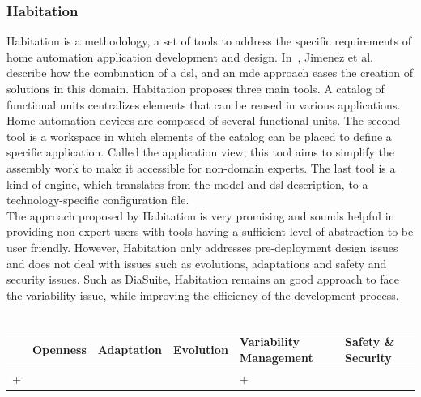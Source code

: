 \subsubsection{Habitation}
Habitation is a methodology, a set of tools to address the specific requirements of home automation application development and design. In~\cite{Jimenez:2009}, Jimenez et al. describe how the combination of a \gls{dsl}, and an \gls{mde} approach eases the creation of solutions in this domain. Habitation proposes three main tools. A catalog of functional units centralizes elements that can be reused in various applications. Home automation devices are composed of several functional units. The second tool is a workspace in which elements of the catalog can be placed to define a specific application. Called the application view, this tool aims to simplify the assembly work to make it accessible for non-domain experts. The last tool is a kind of engine, which translates from the model and \gls{dsl} description, to a technology-specific configuration file.\\

The approach proposed by Habitation is very promising and sounds helpful in providing non-expert users with tools having a sufficient level of abstraction to be user friendly. However, Habitation only addresses pre-deployment design issues and does not deal with issues such as evolutions, adaptations and safety and security issues. Such as DiaSuite, Habitation remains an good approach to face the variability issue, while improving the efficiency of the development process.\\
\\
\begin{tabular}{ >{\centering}m{}| >{\centering}m{} >{\centering}m{}| >{\centering}m{} >{\centering}m{}| >{\centering\arraybackslash}m{}}
{\tiny Interoperability} & {\tiny Openness} & {\tiny Adaptation} & {\tiny Evolution} & {\tiny Variability Management} & {\tiny Safety \& Security}\\
 \hline
 + &  &  &  & + & \\ 
  \hline
\end{tabular}\\


